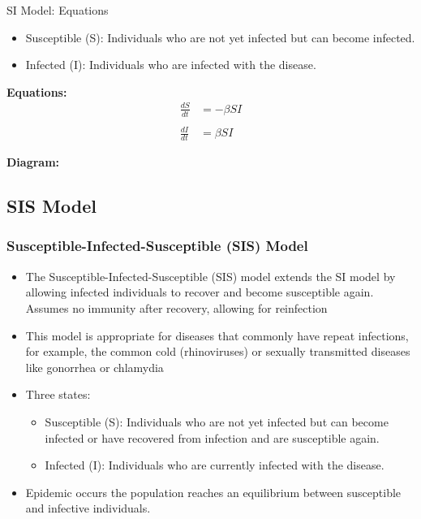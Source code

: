 \begin{frame}{SI Model: Equations}
  \begin{itemize}
    \item Susceptible (S): Individuals who are not yet infected but can become infected.
    \item Infected (I): Individuals who are infected with the disease.
  \end{itemize}
\vfill
\textbf{Equations:}
  \begin{align*}
    \frac{dS}{dt} &= -\beta S I \\
    \\
    \frac{dI}{dt} &= \beta S I
  \end{align*}

\vfill

\textbf{Diagram:}
  \begin{center}
  \end{center}
  
\end{frame}


\subsection{SIS Model}
\begin{frame}
  \frametitle{Susceptible-Infected-Susceptible (SIS) Model}
  \begin{itemize}
    \item The Susceptible-Infected-Susceptible (SIS) model extends the SI model by allowing infected individuals to recover and become susceptible again. Assumes no immunity after recovery, allowing for reinfection
    \item  This model is appropriate for diseases that commonly have repeat infections, for example, the common cold (rhinoviruses) or sexually transmitted diseases like gonorrhea or chlamydia
    \item Three states: 
    \begin{itemize}
        \item Susceptible (S): Individuals who are not yet infected but can become infected or have recovered from infection and are susceptible again.
        \item Infected (I): Individuals who are currently infected with the disease.
    \end{itemize}
    \item Epidemic occurs the population reaches an equilibrium between susceptible and infective individuals.
  \end{itemize}
\end{frame}

